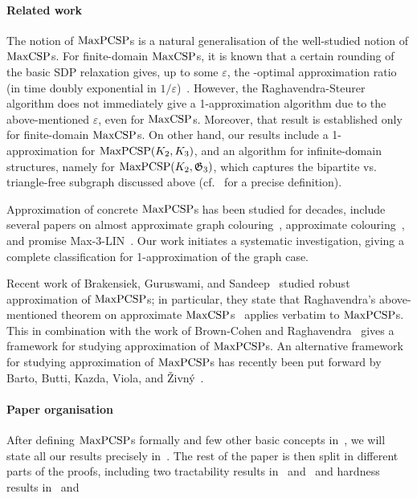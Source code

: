 \documentclass[a4paper,11pt, DIV=11]{scrartcl}
\renewcommand{\epsilon}{\varepsilon}
\renewcommand{\G}{\ensuremath{\mathfrak{G}}}
\DeclareMathOperator{\maxPCSP}{\textup{MaxPCSP}}
\DeclareMathOperator{\maxCSP}{\textup{MaxCSP}}
\theoremstyle{plain}
\theoremstyle{definition}
\begin{document}
\paragraph{Related work}

The notion of $\maxPCSP$s is a natural generalisation of the well-studied notion of $\maxCSP$s. 
For finite-domain $\maxCSP$s, it is known that a certain rounding of the basic SDP relaxation gives,
up to some $\epsilon$,
the \UGC-optimal approximation ratio (in time doubly exponential in $1 /
\epsilon$)~\cite{Raghavendra08:everycsp,Raghavendra09:focs}. 
However, the
Raghavendra-Steurer algorithm does not immediately give a 1-approximation
algorithm due to the above-mentioned $\epsilon$, even for $\maxCSP$s. Moreover,
that result is established only for finite-domain $\maxCSP$s. 
On other hand, our results include a 1-approximation for $\maxPCSP(K_2,
K_3)$, and an algorithm for infinite-domain structures, namely for
$\maxPCSP(K_2, \G_3)$, which captures the bipartite vs. triangle-free subgraph
discussed above (cf.~ for a precise definition).

Approximation of concrete $\maxPCSP$s has been studied for decades, include
several papers on almost approximate graph
colouring~\cite{Engebretsen08:rsa,Dinur10:focs,Khot12:focs,Hecht23:approx},
approximate colouring~\cite{nz23:arxiv}, and promise
Max-3-LIN~\cite{blz25:icalp}. Our work initiates a systematic investigation,
giving a complete classification for 1-approximation of the graph case.

Recent work of Brakensiek, Guruswami, and Sandeep~\cite{BGS23:stoc} studied
robust approximation of $\maxPCSP$s; in particular, they state that
Raghavendra's above-mentioned theorem on approximate
$\maxCSP$s~\cite{Raghavendra08:everycsp} applies verbatim to $\maxPCSP$s. This
in combination with the work of Brown-Cohen and Raghavendra~\cite{BCR15} gives a
framework for studying approximation of $\maxPCSP$s. An alternative framework
for studying approximation of $\maxPCSP$s has recently been put forward by
Barto, Butti, Kazda, Viola, and \v{Z}ivn\'y~\cite{Barto24:arxiv-algebraic}. 

\paragraph{Paper organisation}

After defining $\maxPCSP$s formally and few other basic concepts
in~, we will state all our results precisely
in~. The rest of the paper is then split in different parts of
the proofs, including two tractability results in~
and~ and hardness results in~
and~
\end{document}
